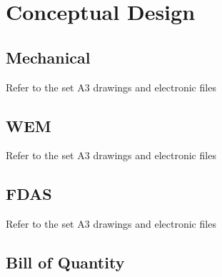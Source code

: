 \chapter{Conceptual Design}\label{conceptdesign}
\section{Mechanical} \label{app_design_mech}
Refer to the set A3 drawings and electronic files
\section{WEM} \label{app_design_wem}
Refer to the set A3 drawings and electronic files
\section{FDAS} \label{app_design_fdas}
Refer to the set A3 drawings and electronic files
\pagebreak
\section{Bill of Quantity} \label{app_boq}

